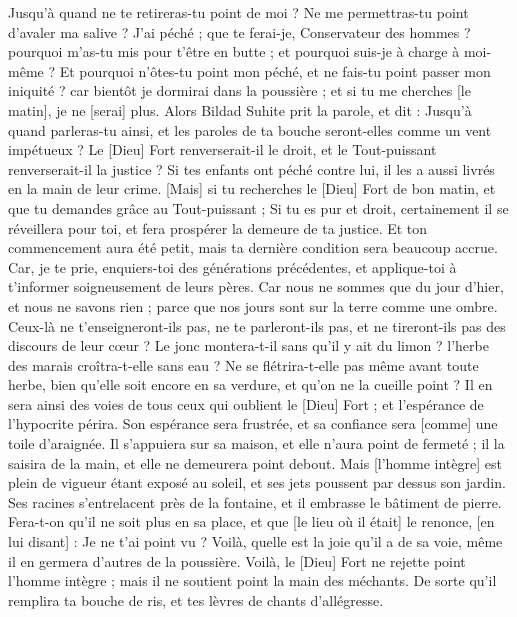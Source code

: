 \begin{multicols}{2}
Jusqu'à quand ne te retireras-tu point de moi ? Ne me permettras-tu point d'avaler ma salive ?
J'ai péché ; que te ferai-je, Conservateur des hommes ? pourquoi m'as-tu mis pour t'être en butte ; et pourquoi suis-je à charge à moi-même ?
Et pourquoi n'ôtes-tu point mon péché, et ne fais-tu point passer mon iniquité ? car bientôt je dormirai dans la poussière ; et si tu me cherches [le matin], je ne [serai] plus.
\VerseOne{}Alors Bildad Suhite prit la parole, et dit :
Jusqu'à quand parleras-tu ainsi, et les paroles de ta bouche seront-elles comme un vent impétueux ?
Le [Dieu] Fort renverserait-il le droit, et le Tout-puissant renverserait-il la justice ?
Si tes enfants ont péché contre lui, il les a aussi livrés en la main de leur crime.
[Mais] si tu recherches le [Dieu] Fort de bon matin, et que tu demandes grâce au Tout-puissant ;
Si tu es pur et droit, certainement il se réveillera pour toi, et fera prospérer la demeure de ta justice.
Et ton commencement aura été petit, mais ta dernière condition sera beaucoup accrue.
Car, je te prie, enquiers-toi des générations précédentes, et applique-toi à t'informer soigneusement de leurs pères.
Car nous ne sommes que du jour d'hier, et nous ne savons rien ; parce que nos jours sont sur la terre comme une ombre.
Ceux-là ne t'enseigneront-ils pas, ne te parleront-ils pas, et ne tireront-ils pas des discours de leur cœur ?
Le jonc montera-t-il sans qu'il y ait du limon ? l'herbe des marais croîtra-t-elle sans eau ?
Ne se flétrira-t-elle pas même avant toute herbe, bien qu'elle soit encore en sa verdure, et qu'on ne la cueille point ?
Il en sera ainsi des voies de tous ceux qui oublient le [Dieu] Fort ; et l'espérance de l'hypocrite périra.
Son espérance sera frustrée, et sa confiance sera [comme] une toile d'araignée.
Il s'appuiera sur sa maison, et elle n'aura point de fermeté ; il la saisira de la main, et elle ne demeurera point debout.
Mais [l'homme intègre] est plein de vigueur étant exposé au soleil, et ses jets poussent par dessus son jardin.
Ses racines s'entrelacent près de la fontaine, et il embrasse le bâtiment de pierre.
Fera-t-on qu'il ne soit plus en sa place, et que [le lieu où il était] le renonce, [en lui disant] : Je ne t'ai point vu ?
Voilà, quelle est la joie qu'il a de sa voie, même il en germera d'autres de la poussière.
Voilà, le [Dieu] Fort ne rejette point l'homme intègre ; mais il ne soutient point la main des méchants.
De sorte qu'il remplira ta bouche de ris, et tes lèvres de chants d'allégresse.

\end{multicols}
